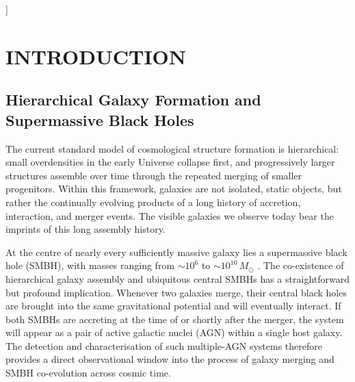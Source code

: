 \documentclass[twocolumn, 10pt]{article}
\newcommand{\todo}[1]{\textcolor{red}{\textbf{[TODO: #1]}}}
\begin{document}
\begin{@twocolumnfalse}
\begin{abstract}
current observations and to guide future searches for multi-AGN systems.

\end{abstract}
\vspace{1em} 
\end{@twocolumnfalse}
]
  
 
\section{INTRODUCTION}
\label{sec:intro}
 
\subsection{Hierarchical Galaxy Formation and Supermassive Black Holes}
\label{subsec:hierarchy}
 
The current standard model of cosmological structure formation is hierarchical: small overdensities in the early Universe collapse first, and progressively larger structures assemble over time through the repeated merging of smaller progenitors. Within this framework, galaxies are not isolated, static objects, but rather the continually evolving products of a long history of accretion, interaction, and merger events. The visible galaxies we observe today bear the imprints of this long assembly history.
 
At the centre of nearly every sufficiently massive galaxy lies a supermassive black hole (SMBH), with masses ranging from $\sim 10^6$ to $\sim 10^{10}\,M_\odot$ \citep{KormendyHo2013}. The co-existence of hierarchical galaxy assembly and ubiquitous central SMBHs has a straightforward but profound implication. Whenever two galaxies merge, their central black holes are brought into the same gravitational potential and will eventually interact. If both SMBHs are accreting at the time of or shortly after the merger, the system will appear as a pair of active galactic nuclei (AGN) within a single host galaxy. The detection and characterisation of such multiple-AGN systems therefore provides a direct observational window into the process of galaxy merging and SMBH co-evolution across cosmic time.
 
\end{document}
